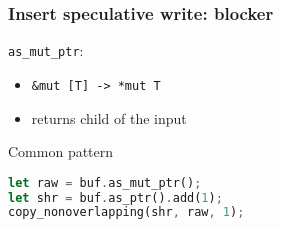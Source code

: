 \begin{frame}[fragile, t]
    \frametitle{Insert speculative write: blocker}

    \begin{exampleblock}{\texttt{as\_mut\_ptr}: }
        \begin{itemize}
            \item \texttt{\&mut [T] -> *mut T}
            \item returns \phantom{aaaaaaaaaa.} child of the input
        \end{itemize}
    \end{exampleblock}

    \begin{block}{{\cmark} Common pattern}
        \begin{lstlisting}[language=rust, basicstyle=\ttfamily\scriptsize]
let raw = buf.as_mut_ptr();
let shr = buf.as_ptr().add(1);
copy_nonoverlapping(shr, raw, 1);
        \end{lstlisting}
    \end{block}


\end{frame}
